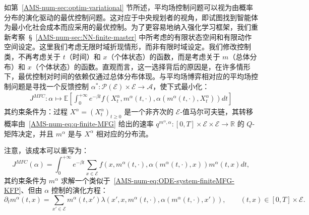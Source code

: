 \documentclass{amsproc}
\theoremstyle{definition}
\theoremstyle{remark}
\numberwithin{equation}{section}
\newcommand{\EE}{{\mathbb E}}
\newcommand{\RR}{{\mathbb R}}
\newcommand{\cA}{{\mathcal A}}
\newcommand{\cE}{{\mathcal E}}
\newcommand{\cP}{{\mathcal P}}
\newcommand{\ctrl}{\alpha}
\begin{document}
如第~\ref{AMS-num-sec:optim-variational} 节所述，平均场控制问题可以视为由概率分布的演化驱动的最优控制问题。这对应于中央规划者的视角，即试图找到智能体为最小化社会成本而应采用的最优控制。为了更容易地纳入强化学习框架，我们重新考察~\S~\ref{AMS-num-sec:NN-finite-master} 中所考虑的有限状态空间和有限动作空间设定。这里我们考虑无限时域折现情形，而非有限时域设定。我们修改控制类，不再考虑关于 $t$（时间）和 $x$（个体状态）的函数，而是考虑关于 $m$（总体分布）和 $x$（个体状态）的函数。直观而言，这一选择背后的原因是，在许多情形下，最优控制对时间的依赖仅通过总体分布体现。与平均场博弈相对应的平均场控制问题是寻找一个反馈控制 $\ctrl^*: \cP(\cE) \times \cE \to \cA$，使下式最小化：
\begin{align*}
	J^{MFC}: \ctrl \mapsto  \EE \left[\int_0^{+\infty} e^{-\beta t} f(X_t^{\ctrl}, m^\ctrl(t,\cdot), \ctrl(m^\ctrl(t,\cdot),X_t^{\ctrl}) ) dt  \right]
\end{align*}
其约束条件为：过程 $X^{\ctrl} = (X_t^{\ctrl})_{t \ge 0}$ 是一个非齐次的 $\cE$-值马尔可夫链，其转移概率由~\eqref{AMS-num-eq:q-finite-MFG} 给出的速率 $q^{m^\ctrl, \ctrl}: [0,T] \times \cE \times \cE \to \RR$ 的 $Q$-矩阵决定，并且 $m^\ctrl$ 是与 $X^{\ctrl}$ 相对应的分布流。

注意，该成本可以重写为：
$$
	J^{MFC}(\ctrl) = \int_0^{+\infty} e^{-\beta t} \sum_{x\in\cE} f(x, m^\ctrl(t,\cdot), \ctrl(m^\ctrl(t,\cdot),x) ) m^\ctrl(t,x) dt ,
$$
其约束条件为 $m^\ctrl$ 求解一个类似于~\eqref{AMS-num-eq:ODE-system-finiteMFG-KFP}、但由 $\ctrl$ 控制的演化方程：
$$
	\partial_t m^\ctrl(t,x) = \sum_{x' \in \cE} m^\ctrl(t,x') \lambda(x', x, m^\ctrl(t,\cdot), \ctrl(m^\ctrl(t,\cdot), x')), \qquad (t,x) \in [0,T] \times \cE.
$$
\end{document}
